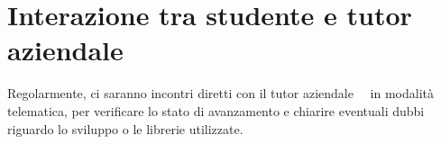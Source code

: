 \section*{Interazione tra studente e tutor aziendale}

Regolarmente, ci saranno incontri diretti con il tutor aziendale \nomeTutorAziendale\ \cognomeTutorAziendale\ in modalità telematica, per verificare lo stato di avanzamento e chiarire eventuali dubbi riguardo lo sviluppo o le librerie utilizzate.